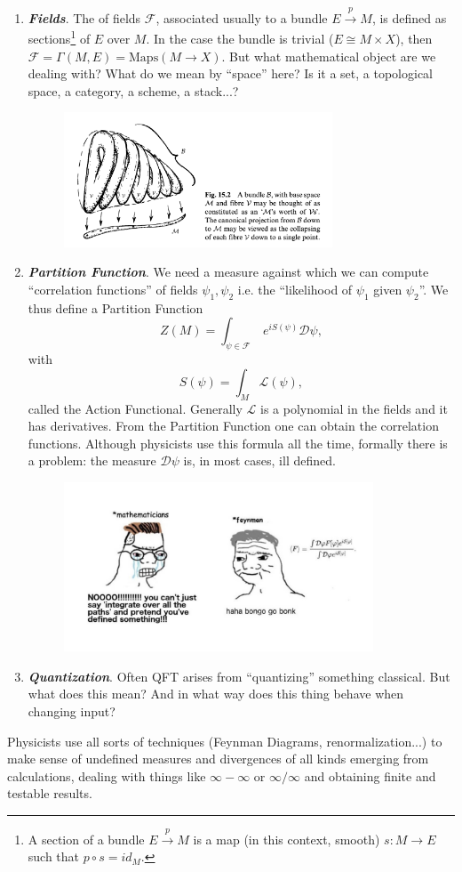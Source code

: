 \begin{enumerate}
    \item \textbf{\textit{Fields}}. The  of fields $\mathcal{F}$, associated usually to a bundle $E\xrightarrow{p}M$, is defined as sections\footnote{A section of a bundle $E\xrightarrow{p}M$ is a map (in this context, smooth) $s:M\to E$ such that $p\circ s=id_M$.} of $E$ over $M$. In the case the bundle is trivial ($E\cong M\times X$), then $\mathcal{F}=\Gamma(M,E)=\text{Maps}(M\rightarrow X)$. But what mathematical object are we dealing with? What do we mean by ``space'' here? Is it a set, a topological space, a category, a scheme, a stack...?\\
    \begin{figure}[!ht]
        \centering
        \includegraphics[width=8cm]{images/Lecture 1/penrose.png}
    \end{figure}
    \item \textbf{\textit{Partition Function}}. We need a measure against which we can compute
     ``correlation functions'' of fields $\psi_1,\psi_2$ i.e. the ``likelihood of $\psi_1$ given
      $\psi_2$''. We thus define a Partition Function
    $$Z(M)=\int_{\psi\in\mathcal{F}}\ e^{iS(\psi)}\mathcal{D}\psi,$$
    with
    $$S(\psi)=\int_M \mathcal{L}(\psi),$$
    called the Action Functional. Generally $\mathcal{L}$ is a polynomial in the fields and it has derivatives. From the Partition Function one can obtain the correlation functions. Although physicists use this formula all the time, formally there is a problem: the measure $\mathcal{D}\psi$ is, in most cases, ill defined.
    \begin{figure}[!ht]
        \centering
        \includegraphics[width=9.2cm]{images/Lecture 1/feynman.png}
    \end{figure}
    \item \textbf{\textit{Quantization}}. Often QFT arises from ``quantizing'' something classical. But what does this mean? And in what way does this thing behave when changing input?
\end{enumerate}
Physicists use all sorts of techniques (Feynman Diagrams, renormalization...) to make sense of undefined measures and divergences of all kinds emerging from calculations, dealing with things like $\infty-\infty$ or $\infty/\infty$ and obtaining finite and testable results.

